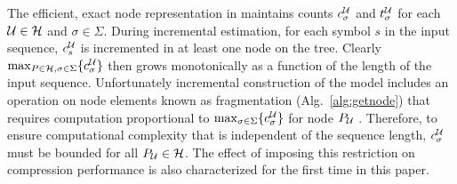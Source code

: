 The efficient, exact node representation in \cite{Gasthaus2011} maintains counts $c^\U_\sigma$ and $t^\U_\sigma$ for each $\U \in \mathcal{H}$ and $\sigma \in \Sigma$.  During incremental estimation, for each symbol $s$ in the input sequence, $c^\U_s$ is incremented in at least one node on the tree.  Clearly $\max_{P \in \mathcal{H}, \sigma \in \Sigma} \{ c^\U_\sigma \}$ then grows monotonically as a function of the length of the input sequence. Unfortunately incremental construction of the model includes an operation on node elements known as fragmentation (Alg.~\ref{alg:getnode}) that requires computation proportional to $\max_{\sigma \in \Sigma} \{ c_\sigma^\U \}$ for node $P_\U$ \citep{Gasthaus2011}. Therefore, to ensure computational complexity that is independent of the sequence length, $c^\U_\sigma$ must be bounded for all $P_\U \in \mathcal{H}$.  The effect of imposing this restriction on compression performance is also characterized for the first time in this paper. 








